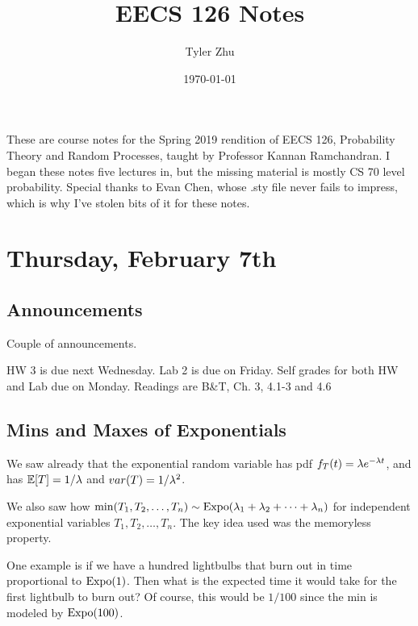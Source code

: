 \documentclass[11 pt]{scrartcl}
\begin{document}
 
\title{\Large EECS 126 Notes}
\author{\large Tyler Zhu}
\date{\large\today}

\maketitle 

These are course notes for the Spring 2019 rendition of EECS 126, Probability Theory and Random Processes, taught by Professor Kannan Ramchandran. I began these notes five lectures in, but the missing material is mostly CS 70 level probability. Special thanks to Evan Chen, whose .sty file never fails to impress, which is why I've stolen bits of it for these notes.  

\tableofcontents 

\newpage


\section{Thursday, February 7th}
\subsection{Announcements}
Couple of announcements. 
\begin{itemize}
    \ii HW 3 is due next Wednesday. 
    \ii Lab 2 is due on Friday. 
    \ii Self grades for both HW and Lab due on Monday. 
    \ii Readings are B\&T, Ch. 3, 4.1-3 and 4.6 
\end{itemize}

\subsection{Mins and Maxes of Exponentials}
We saw already that the exponential random variable has pdf $f_T(t) = \lambda e^{-\lambda t}$, and has $\mathbb E[T] = 1/\lambda$ and $var(T) = 1/\lambda^2$. 

We also saw how $\min(T_1, T_2, \dots, T_n) \sim \text{Expo}(\lambda_1+\lambda_2 + \dots + \lambda_n)$ for independent exponential variables $T_1, T_2, \dots, T_n$. The key idea used was the memoryless property. 

One example is if we have a hundred lightbulbs that burn out in time proportional to $\text{Expo}(1)$. Then what is the expected time it would take for the first lightbulb to burn out? Of course, this would be $1/100$ since the min is modeled by $\text{Expo}(100)$. 
\end{document}
